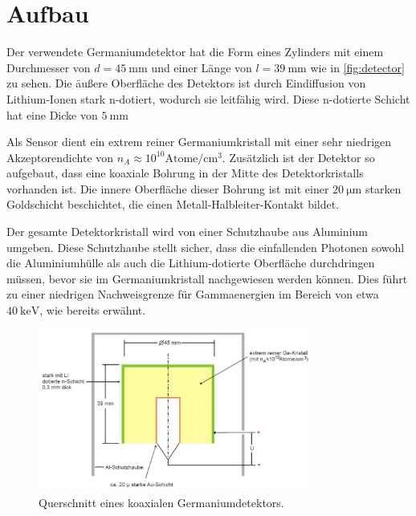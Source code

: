 \section{Aufbau}\label{sec:aufbau}
Der verwendete Germaniumdetektor hat die Form eines Zylinders mit einem Durchmesser von $d = \SI{45}{\milli\meter}$ und einer Länge von $l = \SI{39}{\milli\meter}$ wie in \autoref{fig:detector} zu sehen. Die äußere Oberfläche des Detektors ist durch Eindiffusion von Lithium-Ionen stark n-dotiert, wodurch sie leitfähig wird. Diese n-dotierte Schicht hat eine Dicke von $\SI{5}{\milli\meter}$

Als Sensor dient ein extrem reiner Germaniumkristall mit einer sehr niedrigen Akzeptorendichte von $ n_A \approx 10^{10} \mathrm{Atome/cm^3}$. Zusätzlich ist der Detektor so aufgebaut, dass eine koaxiale Bohrung in der Mitte des Detektorkristalls vorhanden ist. Die innere Oberfläche dieser Bohrung ist mit einer $\SI{20}{\micro\meter}$ starken Goldschicht beschichtet, die einen Metall-Halbleiter-Kontakt bildet.

Der gesamte Detektorkristall wird von einer Schutzhaube aus Aluminium umgeben. Diese Schutzhaube stellt sicher, dass die einfallenden Photonen sowohl die Aluminiumhülle als auch die Lithium-dotierte Oberfläche durchdringen müssen, bevor sie im Germaniumkristall nachgewiesen werden können. Dies führt zu einer niedrigen Nachweisgrenze für Gammaenergien im Bereich von etwa $\SI{40}{\kilo\eV}$, wie bereits erwähnt.

\begin{figure}[h!]
    \centering
    \includegraphics[width=0.8\textwidth]{Ressourcen/detector.png} %
    \caption{Querschnitt eines koaxialen Germaniumdetektors.\cite{anleitung}}
    \label{fig:detector}
\end{figure}